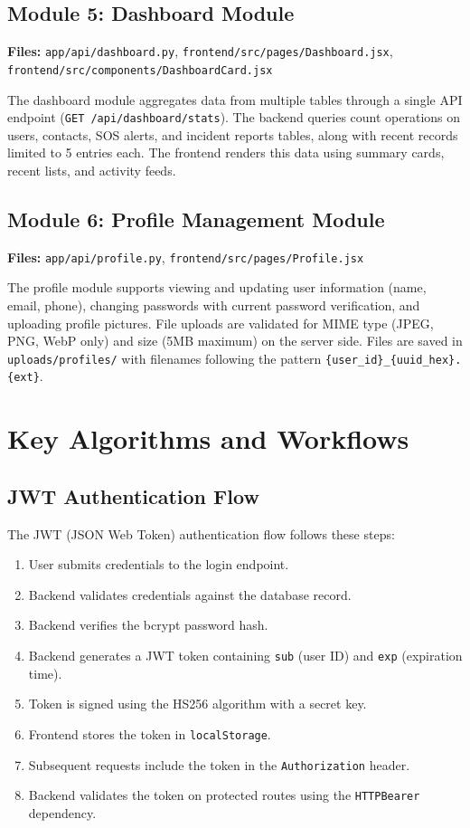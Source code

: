 \subsection{Module 5: Dashboard Module}

\textbf{Files:} \texttt{app/api/dashboard.py}, \texttt{frontend/src/pages/Dashboard.jsx}, \texttt{frontend/src/components/DashboardCard.jsx}

The dashboard module aggregates data from multiple tables through a single API endpoint (\texttt{GET /api/dashboard/stats}). The backend queries count operations on users, contacts, SOS alerts, and incident reports tables, along with recent records limited to 5 entries each. The frontend renders this data using summary cards, recent lists, and activity feeds.

\subsection{Module 6: Profile Management Module}

\textbf{Files:} \texttt{app/api/profile.py}, \texttt{frontend/src/pages/Profile.jsx}

The profile module supports viewing and updating user information (name, email, phone), changing passwords with current password verification, and uploading profile pictures. File uploads are validated for MIME type (JPEG, PNG, WebP only) and size (5MB maximum) on the server side. Files are saved in \texttt{uploads/profiles/} with filenames following the pattern \texttt{\{user\_id\}\_\{uuid\_hex\}.\{ext\}}.

\section{Key Algorithms and Workflows}

\subsection{JWT Authentication Flow}

The JWT (JSON Web Token) authentication flow follows these steps:

\begin{enumerate}
  \item User submits credentials to the login endpoint.
  \item Backend validates credentials against the database record.
  \item Backend verifies the bcrypt password hash.
  \item Backend generates a JWT token containing \texttt{sub} (user ID) and \texttt{exp} (expiration time).
  \item Token is signed using the HS256 algorithm with a secret key.
  \item Frontend stores the token in \texttt{localStorage}.
  \item Subsequent requests include the token in the \texttt{Authorization} header.
  \item Backend validates the token on protected routes using the \texttt{HTTPBearer} dependency.
\end{enumerate}

